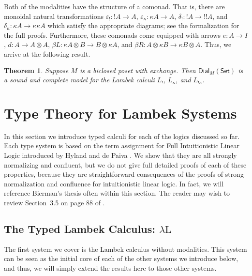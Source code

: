 \documentclass{article}
\let\mto\to                     %
\let\to\relax                   %
\newcommand{\to}{\rightarrow}
\newcommand{\Set}{\mathsf{Set}}
\newcommand{\Dial}[2]{\mathsf{Dial}_{#1}(#2)}
\newtheorem{theorem}{Theorem}
\begin{document}
Both of the modalities have the structure of a comonad.  That is,
there are monoidal natural transformations $\varepsilon_! : !A \mto
A$, $\varepsilon_\kappa : \kappa A \mto A$, $\delta_! : !A \mto !!A$,
and $\delta_\kappa : \kappa A \mto \kappa\kappa A$ which satisfy the
appropriate diagrams; see the formalization for the full
proofs. Furthermore, these comonads come equipped with arrows $e : A
\mto I$, $d : A \mto A \otimes A$, $\beta L : \kappa A \otimes B \mto B
\otimes \kappa A$, and $\beta R : A \otimes \kappa B \mto \kappa B
\otimes A$.  Thus, we arrive at the following result.

\begin{theorem}
  \label{thm:sound-dial-exchange-!}
  Suppose $M$ is a biclosed poset with exchange.  Then
  $\Dial{M}{\Set}$ is a sound and complete model for the Lambek
  calculi $L_!$, $L_\kappa$, and $L_{!\kappa}$.
\end{theorem}

\section{Type Theory for Lambek Systems}
\label{sec:typed_lambek_calculi}
In this section we introduce typed calculi for each of the logics
discussed so far.  Each type system is based on the term assignment
for Full Intuitionistic Linear Logic introduced by Hyland and de Paiva
\cite{Hyland:1993}.  We show that they are all strongly normalizing
and confluent, but we do not give full detailed proofs of each of
these properties, because they are straightforward consequences of the
proofs of strong normalization and confluence for intuitionistic
linear logic.  In fact, we will reference Bierman's thesis often
within this section.  The reader may wish to review Section~3.5 on
page 88 of \cite{Bierman:1994}.

\subsection{The Typed Lambek Calculus: $\lambda\text{L}$}
\label{subsec:the_typed_lambek_calculus_lambda-l}

The first system we cover is the Lambek calculus without
modalities. This system can be seen as the initial core of each of the
other systems we introduce below, and thus, we will simply extend the
results here to those other systems.  
\end{document}
